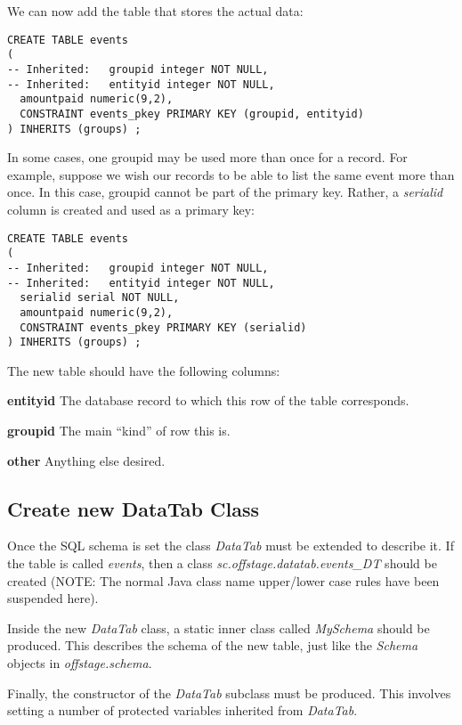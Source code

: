 \documentclass[11pt]{article}
\begin{document}
We can now add the table that stores the actual data:
\begin{verbatim}
CREATE TABLE events
(
-- Inherited:   groupid integer NOT NULL,
-- Inherited:   entityid integer NOT NULL,
  amountpaid numeric(9,2),
  CONSTRAINT events_pkey PRIMARY KEY (groupid, entityid)
) INHERITS (groups) ;
\end{verbatim}

In some cases, one groupid may be used more than once for a record.  For example, suppose we wish our records to be able to list the same event more than once.  In this case, groupid cannot be part of the primary key.  Rather, a \emph{serialid} column is created and used as a primary key:

\begin{verbatim}
CREATE TABLE events
(
-- Inherited:   groupid integer NOT NULL,
-- Inherited:   entityid integer NOT NULL,
  serialid serial NOT NULL,
  amountpaid numeric(9,2),
  CONSTRAINT events_pkey PRIMARY KEY (serialid)
) INHERITS (groups) ;
\end{verbatim}




The new table should have the following columns:
 \begin{description}
\item{{\bf entityid}} The database record to which this row of the table corresponds.
\item{{\bf groupid}} The main ``kind'' of row this is.
\item{{\bf other}} Anything else desired.
 \end{description}

\subsection{Create new DataTab Class}

Once the SQL schema is set the class \emph{DataTab} must be extended to describe it.  If the table is called \emph{events}, then a class \emph{sc.offstage.datatab.events\_DT} should be created (NOTE: The normal Java class name upper/lower case rules have been suspended here).

Inside the new \emph{DataTab} class, a static inner class called \emph{MySchema} should be produced.  This describes the schema of the new table, just like the \emph{Schema} objects in \emph{offstage.schema}.

Finally, the constructor of the \emph{DataTab} subclass must be produced.  This involves setting a number of protected variables inherited from \emph{DataTab}.
\end{document}
